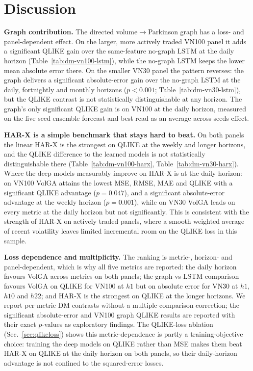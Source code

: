 \documentclass{llncs}
\begin{document}
\FloatBarrier
\section{Discussion}\label{sec:disc}
\textbf{Graph contribution.} The directed volume$\to$Parkinson graph has a loss- and panel-dependent
effect. On the larger, more actively traded VN100 panel it adds a significant QLIKE gain over the
same-feature no-graph LSTM at the daily horizon (Table~\ref{tab:dm-vn100-lstm}), while the no-graph
LSTM keeps the lower mean absolute error there. On the smaller VN30 panel the pattern reverses: the
graph delivers a significant absolute-error gain over the no-graph LSTM at the daily, fortnightly and
monthly horizons ($p<0.001$; Table~\ref{tab:dm-vn30-lstm}), but the QLIKE contrast is not statistically
distinguishable at any horizon. The graph's only significant QLIKE gain is on VN100 at the daily
horizon, measured on the five-seed ensemble forecast and best read as an average-across-seeds effect.

\textbf{HAR-X is a simple benchmark that stays hard to beat.} On both panels the linear HAR-X is the
strongest on QLIKE at the weekly and longer horizons, and the QLIKE difference to the learned models is
not statistically distinguishable there (Table~\ref{tab:dm-vn100-harx}, Table~\ref{tab:dm-vn30-harx}).
Where the deep models measurably improve on HAR-X is at the daily horizon: on VN100 VolGA attains the
lowest MSE, RMSE, MAE and QLIKE with a significant QLIKE advantage ($p=0.047$), and a significant
absolute-error advantage at the weekly horizon ($p=0.001$), while on VN30 VolGA leads on every metric
at the daily horizon but not significantly. This is consistent with the strength of HAR-X on actively
traded panels, where a smooth weighted average of recent volatility leaves limited incremental room on
the QLIKE loss in this sample.

\textbf{Loss dependence and multiplicity.} The ranking is metric-, horizon- and panel-dependent, which
is why all five metrics are reported: the daily horizon favours VolGA across metrics on both panels;
the graph-vs-LSTM comparison favours VolGA on QLIKE for VN100 at $h1$ but on absolute error for VN30 at
$h1$, $h10$ and $h22$; and HAR-X is the strongest on QLIKE at the longer horizons. We report per-metric
DM contrasts without a multiple-comparison correction; the significant absolute-error and VN100 graph
QLIKE results are reported with their exact $p$-values as exploratory findings. The QLIKE-loss
ablation (Sec.~\ref{sec:qlikeloss}) shows this metric-dependence is partly a training-objective
choice: training the deep models on QLIKE rather than MSE makes them beat HAR-X on QLIKE at the daily
horizon on both panels, so their daily-horizon advantage is not confined to the squared-error losses.
\end{document}
